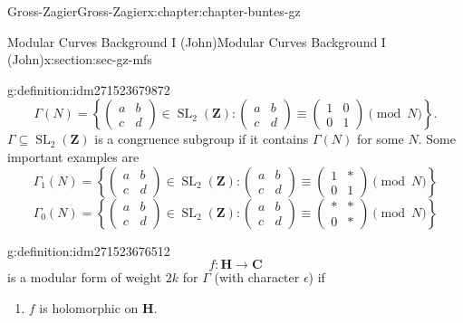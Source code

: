 \documentclass[oneside,10pt,]{book}
\numberwithin{equation}{section}
\newcommand{\ZZ}{\mathbf{Z}}
\newcommand{\CC}{\mathbf{C}}
\newcommand{\HH}{\mathbf{H}}
\DeclareMathOperator{\SL}{SL}
\newcommand{\amp}{&}
\begin{document}
\begin{chapterptx}{Gross-Zagier}{}{Gross-Zagier}{}{}{x:chapter:chapter-buntes-gz}
\begin{sectionptx}{Modular Curves Background I (John)}{}{Modular Curves Background I (John)}{}{}{x:section:sec-gz-mfs}
\begin{definition}{}{g:definition:idm271523679872}
\begin{equation*}
\Gamma (N) = \left\{\begin{pmatrix} a \amp b \\ c \amp d \end{pmatrix}\in \SL_2(\ZZ) : \begin{pmatrix} a \amp b \\ c \amp d \end{pmatrix} \equiv \begin{pmatrix} 1 \amp 0 \\ 0 \amp 1 \end{pmatrix} \pmod N\right\}\text{.}
\end{equation*}
\(\Gamma\subseteq \SL_2(\ZZ)\) is a  congruence subgroup if it contains \(\Gamma (N)\) for some \(N\). Some important examples are%
\begin{equation*}
\Gamma_1 (N) = \left\{\begin{pmatrix} a \amp b \\ c \amp d \end{pmatrix}\in \SL_2(\ZZ) : \begin{pmatrix} a \amp b \\ c \amp d \end{pmatrix} \equiv \begin{pmatrix} 1 \amp \ast \\ 0 \amp 1 \end{pmatrix} \pmod N\right\}
\end{equation*}
%
\begin{equation*}
\Gamma_0 (N) = \left\{\begin{pmatrix} a \amp b \\ c \amp d \end{pmatrix}\in \SL_2(\ZZ) : \begin{pmatrix} a \amp b \\ c \amp d \end{pmatrix} \equiv \begin{pmatrix} \ast \amp \ast \\ 0 \amp \ast \end{pmatrix} \pmod N\right\}
\end{equation*}
%
\end{definition}
\begin{definition}{}{g:definition:idm271523676512}%
%
\begin{equation*}
f\colon \HH \to \CC
\end{equation*}
is a modular form of weight \(2k\) for \(\Gamma \) (with character \(\epsilon \)) if%
\begin{enumerate}
\item{}\(f\) is holomorphic on \(\HH\).%

\end{enumerate}
\end{definition}
\end{sectionptx}
\end{chapterptx}
\end{document}
